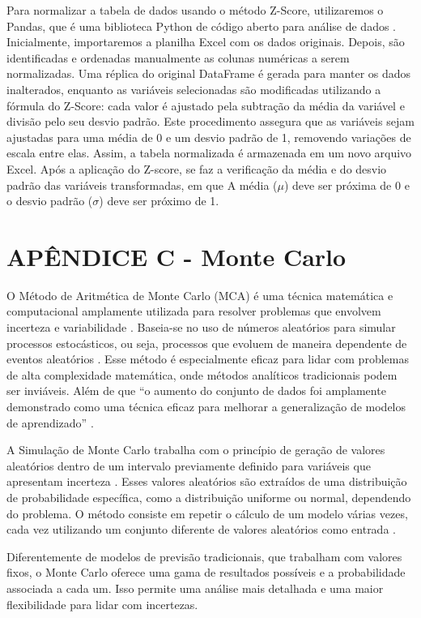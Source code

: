 \begin{apendicesenv}
Para normalizar a tabela de dados usando o método Z-Score, utilizaremos o  Pandas, que é uma biblioteca Python de código aberto para análise de dados \cite{chen2018}. Inicialmente, importaremos a planilha Excel com os dados originais. Depois, são identificadas e ordenadas manualmente as colunas numéricas a serem normalizadas. Uma réplica do original DataFrame é gerada para manter os dados inalterados, enquanto as variáveis selecionadas são modificadas utilizando a fórmula do Z-Score: cada valor é ajustado pela subtração da média da variável e divisão pelo seu desvio padrão. Este procedimento assegura que as variáveis sejam ajustadas para uma média de 0 e um desvio padrão de 1, removendo variações de escala entre elas. Assim, a tabela normalizada é armazenada em um novo arquivo Excel. Após a aplicação do Z-score, se faz a verificação da média e do desvio padrão das variáveis transformadas, em que A média (\(\mu\)) deve ser próxima de 0 e o desvio padrão (\(\sigma\))  deve ser próximo de 1.

\chapter{APÊNDICE C - Monte Carlo}

O Método de Aritmética de Monte Carlo (MCA) é uma técnica matemática e computacional amplamente utilizada para resolver problemas que envolvem incerteza e variabilidade \cite{kalos2009}. Baseia-se no uso de números aleatórios para simular processos estocásticos, ou seja, processos que evoluem de maneira dependente de eventos aleatórios \cite{kalos2009}. Esse método é especialmente eficaz para lidar com problemas de alta complexidade matemática, onde métodos analíticos tradicionais podem ser inviáveis. Além de que “o aumento do conjunto de dados foi amplamente demonstrado como uma técnica eficaz para melhorar a generalização de modelos de aprendizado” \cite{kiar2021}.

A Simulação de Monte Carlo trabalha com o princípio de geração de valores aleatórios dentro de um intervalo previamente definido para variáveis que apresentam incerteza \cite{kalos2009}. Esses valores aleatórios são extraídos de uma distribuição de probabilidade específica, como a distribuição uniforme ou normal, dependendo do problema. O método consiste em repetir o cálculo de um modelo várias vezes, cada vez utilizando um conjunto diferente de valores aleatórios como entrada \cite{kalos2009}. 

Diferentemente de modelos de previsão tradicionais, que trabalham com valores fixos, o Monte Carlo oferece uma gama de resultados possíveis e a probabilidade associada a cada um. Isso permite uma análise mais detalhada e uma maior flexibilidade para lidar com incertezas.


\end{apendicesenv}
